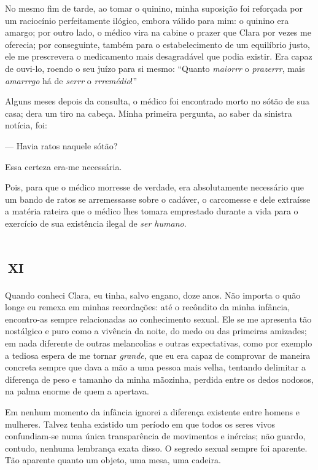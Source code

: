 No mesmo fim de tarde, ao tomar o quinino, minha suposição foi reforçada por um raciocínio perfeitamente ilógico, embora válido para mim: o quinino era amargo; por outro lado, o médico vira na cabine o prazer que Clara por vezes me oferecia; por conseguinte, também para o estabelecimento de um equilíbrio justo, ele me prescrevera o medicamento mais desagradável que podia existir. Era capaz de ouvi-lo, roendo o seu juízo para si mesmo: ``Quanto \textit{maiorrr} o \textit{prazerrr}, mais \textit{amarrrgo} há de \textit{serrr} o \textit{rrremédio}!''

Alguns meses depois da consulta, o médico foi encontrado morto no sótão de sua casa; dera um tiro na cabeça.
Minha primeira pergunta, ao saber da sinistra notícia, foi:

--- Havia ratos naquele sótão?

Essa certeza era-me necessária.

Pois, para que o médico morresse de verdade, era absolutamente necessário que um bando de ratos se arremessasse sobre o cadáver, o carcomesse e dele extraísse a matéria rateira que o médico lhes tomara emprestado durante a vida para o exercício de sua existência ilegal de \textit{ser humano}.


\chapter*{\small{}\,\Large\centering\textsc{xi}\,\small{}}

Quando conheci Clara, eu tinha, salvo engano, doze anos. Não importa o quão longe eu remexa em minhas recordações: até o recôndito da minha infância, encontro-as sempre relacionadas ao conhecimento sexual. Ele se me apresenta tão nostálgico e puro como a vivência da noite, do medo ou das primeiras amizades; em nada diferente de outras melancolias e outras expectativas, como por exemplo a tediosa espera de me tornar \textit{grande}, que eu era capaz de comprovar de maneira concreta sempre que dava a mão a uma pessoa mais velha, tentando delimitar a diferença de peso e tamanho da minha mãozinha, perdida entre os dedos nodosos, na palma enorme de quem a apertava.

Em nenhum momento da infância ignorei a diferença existente entre homens e mulheres. Talvez tenha existido um período em que todos os seres vivos confundiam-se numa única transparência de movimentos e inércias; não guardo, contudo, nenhuma lembrança exata disso. O segredo sexual sempre foi aparente. Tão aparente quanto um objeto, uma mesa, uma cadeira.

